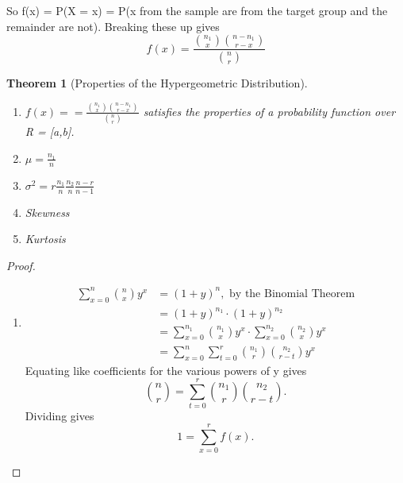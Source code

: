 \documentclass[10pt,]{book}
\theoremstyle{plain}
\newtheorem{theorem}{Theorem}[section]
\theoremstyle{definition}
\theoremstyle{definition}
\theoremstyle{definition}
\numberwithin{equation}{section}
\begin{document}
	So f(x) = P(X = x) = P(x from the sample are from the target group and the remainder are not). Breaking these up gives
	\begin{equation*}f(x) = \frac{\binom{n_1}{x} \binom{n-n_1}{r-x}}{\binom{n}{r}}\end{equation*}
\begin{theorem}[Properties of the Hypergeometric Distribution]\label{theorem-33}
\leavevmode%
\begin{enumerate}
\item\hypertarget{li-166}{}\(f(x) = = \frac{\binom{n_1}{x} \binom{n-n_1}{r-x}}{\binom{n}{r}}\) satisfies the properties of a probability function over R = [a,b].%
\item\hypertarget{li-167}{}\(\mu = \frac{n_1}{n}\)%
\item\hypertarget{li-168}{}\(\sigma^2 = r \frac{n_1}{n} \frac{n_2}{n} \frac{n-r}{n-1}\)%
\item\hypertarget{li-169}{}Skewness%
\item\hypertarget{li-170}{}Kurtosis %
\end{enumerate}
\end{theorem}
\begin{proof}\hypertarget{proof-27}{}
\leavevmode%
\begin{enumerate}
\item\hypertarget{li-171}{}		
			\begin{align*}
\sum_{x=0}^n \binom{n}{x} y^x & = (1+y)^n, \text{ by the Binomial Theorem}\\
& = (1+y)^{n_1} \cdot (1+y)^{n_2} \\
& = \sum_{x=0}^{n_1} \binom{n_1}{x} y^x \cdot \sum_{x=0}^{n_2} \binom{n_2}{x} y^x \\
& = \sum_{x=0}^n \sum_{t=0}^r \binom{n_1}{r} \binom{n_2}{r-t} y^x
\end{align*}		
			Equating like coefficients for the various powers of y gives
			\begin{equation*}\binom{n}{r} = \sum_{t=0}^r \binom{n_1}{r} \binom{n_2}{r-t}.\end{equation*}
			Dividing gives
			\begin{equation*}1 = \sum_{x=0}^r f(x).\end{equation*}
\end{enumerate}
\end{proof}
\typeout{************************************************}
\typeout{************************************************}
\end{document}
